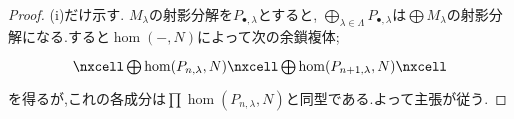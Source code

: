 \begin{proof}
	(i)だけ示す. $M_\lambda$の射影分解を$P_{\bullet,\lambda}$とすると, $\bigoplus_{\lambda\in\Lambda} P_{\bullet,\lambda}$は$\bigoplus M_\lambda$の射影分解になる.すると$\hom(-,N)$によって次の余鎖複体;
	\[\begin{tikzcd}
		\nxcell\bigoplus \hom(P_{n,\lambda},N)\nxcell\bigoplus\hom(P_{n+1,\lambda},N)\nxcell
	\end{tikzcd}\]
	を得るが,これの各成分は$\prod\hom(P_{n,\lambda},N)$と同型である.よって主張が従う.
\end{proof}

%
